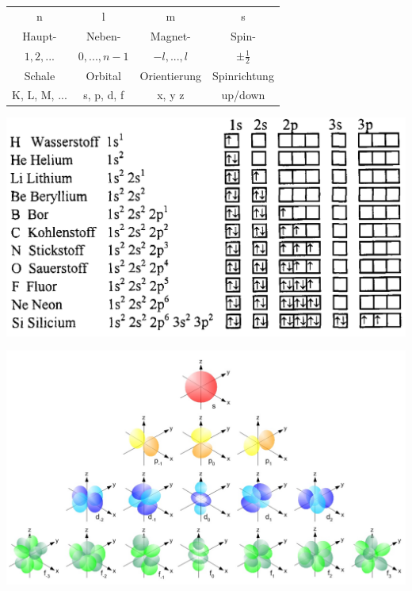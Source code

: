 \documentclass[12pt,a4paper]{article}
\renewcommand{\=}[1]{\stackrel{#1}{=}}
\theoremstyle{definition}
\theoremstyle{remark}
\begin{document}
\begin{center}
\begin{minipage}[t]{.50\linewidth}
\begin{center}
\begin{tabular}{cccc}
n & l & m & s\\
Haupt- & Neben- & Magnet- & Spin- \\
$1, 2, ...$ & $0, ..., n-1$ & $-l, ..., l$& $\pm \frac{1}{2}$\\
Schale & Orbital & Orientierung & Spinrichtung\\
K, L, M, ... & s, p, d, f & x, y z & up/down\\
\end{tabular}
\end{center}
\includegraphics[width=\linewidth]{pic/kaestchen.png}

\end{minipage}
\end{center}

\includegraphics[width=\textwidth]{pic/orbitals.jpg}

\newpage
\end{document}
